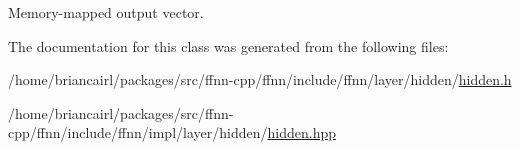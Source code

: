 Memory-\/mapped output vector. 



The documentation for this class was generated from the following files\-:\begin{DoxyCompactItemize}
\item 
/home/briancairl/packages/src/ffnn-\/cpp/ffnn/include/ffnn/layer/hidden/\hyperlink{hidden_8h}{hidden.\-h}\item 
/home/briancairl/packages/src/ffnn-\/cpp/ffnn/include/ffnn/impl/layer/hidden/\hyperlink{hidden_8hpp}{hidden.\-hpp}\end{DoxyCompactItemize}
